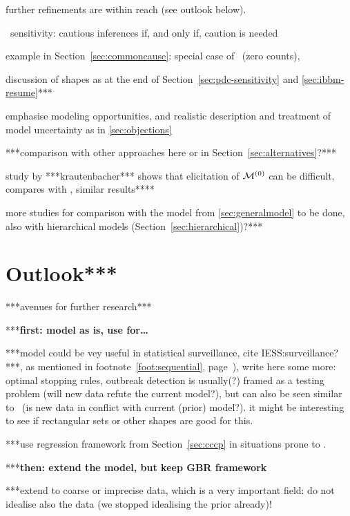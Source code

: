 further refinements are within reach (see outlook below).

\pdc\ sensitivity: cautious inferences if, and only if, caution is needed

example in Section~\ref{sec:commoncause}: special case of \pdc\ (zero counts),


discussion of shapes as at the end of Section~\ref{sec:pdc-sensitivity} and \ref{sec:ibbm-resume}***

emphasise modeling opportunities, and realistic description and treatment
of model uncertainty as in \ref{sec:objections}




***comparison with other approaches here or in Section~\ref{sec:alternatives}?***

study by ***krautenbacher*** shows that elicitation of $\mathcal{M}^{(0)}$ can be difficult,
compares with \textcite{2005:whitcomb}, similar results****

more studies for comparison with the model from \ref{sec:generalmodel} to be done,
also with hierarchical models (Section~\ref{sec:hierarchical})?***







\section{Outlook***}
\label{sec:concluding-outlook}

***avenues for further research***

***\textbf{first: model as is, use for\dots }

***model could be vey useful in statistical surveillance, cite IESS:surveillance?***,
as mentioned in footnote~\ref{foot:sequential}, page~\pageref{foot:sequential}),
write here some more: optimal stopping rules, outbreak detection is usually(?)
framed as a testing problem (will new data refute the current model?),
but can also be seen similar to \pdc\ (is new data in conflict with current (prior) model?).
it might be interesting to see if rectangular sets or other shapes are good for this.  

***use regression framework from Section~\ref{sec:cccp} in situations prone to \pdc.


***\textbf{then: extend the model, but keep GBR framework}

***extend to coarse or imprecise data, which is a very important field:
do not idealise also the data (we stopped idealising the prior already)!

